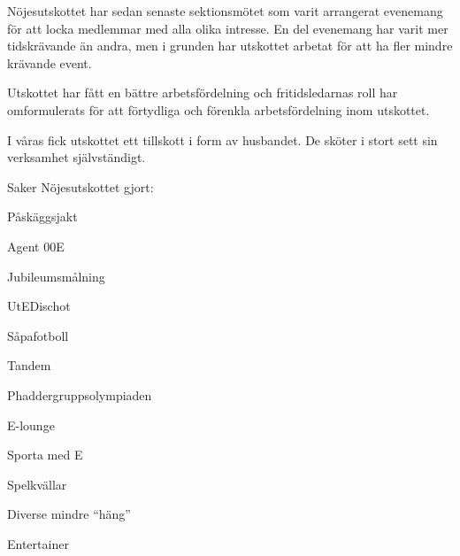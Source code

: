 \documentclass[../_main/handlingar.tex]{subfiles}
\begin{document}
Nöjesutskottet har sedan senaste sektionsmötet som varit arrangerat evenemang för att locka medlemmar med alla olika intresse. En del evenemang har varit mer tidskrävande än andra, men i grunden har utskottet arbetat för att ha fler mindre krävande event.

Utskottet har fått en bättre arbetsfördelning och fritidsledarnas roll har omformulerats för att förtydliga och förenkla arbetsfördelning inom utskottet.

I våras fick utskottet ett tillskott i form av husbandet. De sköter i stort sett sin verksamhet självständigt.

Saker Nöjesutskottet gjort:
\begin{dashlist}
    \item Påskäggsjakt
    \item Agent 00E
    \item Jubileumsmålning
    \item UtEDischot
    \item Såpafotboll
    \item Tandem
    \item Phaddergruppsolympiaden
    \item E-lounge
    \item Sporta med E
    \item Spelkvällar
    \item Diverse mindre ``häng''
\end{dashlist}

\begin{signatures}{1}
    \mvh
    \signature{Albin Nyström Eklund}{Entertainer}
\end{signatures}
\end{document}
